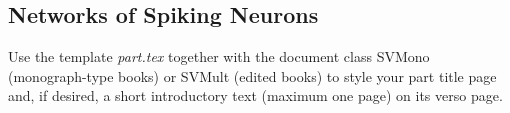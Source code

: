 
\begin{partbacktext}
	\part{Networks of Spiking Neurons}
	\noindent Use the template \emph{part.tex} together with the document class SVMono (monograph-type books) or SVMult (edited books) to style your part title page and, if desired, a short introductory text (maximum one page) on its verso page.
	
	\end{partbacktext}